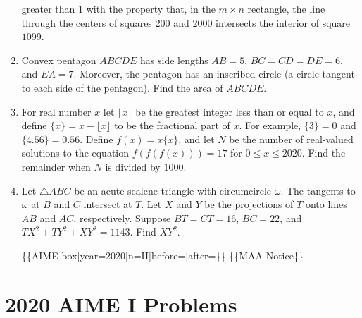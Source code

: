 \documentclass{article}
\begin{document}
\begin{enumerate}[label=\arabic*., itemsep=0.5em]
greater than \(1\) with the property that, in the \(m\times n\) rectangle, the line through the centers of squares \(200\) and \(2000\) intersects the interior of square \(1099\).\par \vspace{0.5em}\item Convex pentagon \(ABCDE\) has side lengths \(AB=5\), \(BC=CD=DE=6\), and \(EA=7\). Moreover, the pentagon has an inscribed circle (a circle tangent to each side of the pentagon). Find the area of \(ABCDE\).\par \vspace{0.5em}\item For real number \(x\) let \(\lfloor x\rfloor\) be the greatest integer less than or equal to \(x\), and define \(\{x\} = x - \lfloor x \rfloor\) to be the fractional part of \(x\). For example, \(\{3\} = 0\) and \(\{4.56\} = 0.56\). Define \(f(x)=x\{x\}\), and let \(N\) be the number of real-valued solutions to the equation \(f(f(f(x)))=17\) for \(0\leq x\leq 2020\). Find the remainder when \(N\) is divided by \(1000\).\par \vspace{0.5em}\item Let \(\triangle ABC\) be an acute scalene triangle with circumcircle \(\omega\). The tangents to \(\omega\) at \(B\) and \(C\) intersect at \(T\). Let \(X\) and \(Y\) be the projections of \(T\) onto lines \(AB\) and \(AC\), respectively. Suppose \(BT = CT = 16\), \(BC = 22\), and \(TX^2 + TY^2 + XY^2 = 1143\). Find \(XY^2\).



\{\{AIME box|year=2020|n=II|before=|after=\}\}
\{\{MAA Notice\}\}\par \vspace{0.5em}
\end{enumerate}
\newpage\section*{2020 AIME I Problems}
\end{document}
